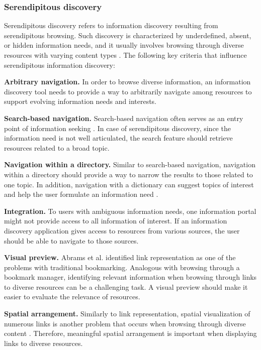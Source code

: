 \documentclass{casconpaper}
\begin{document}
{\subsubsection{Serendipitous discovery}
Serendipitous discovery refers to information discovery resulting from serendipitous  browsing. Such discovery is characterized by underdefined, absent, or hidden information needs, and it usually involves browsing through diverse resources with varying content types \cite{kellar2006}. The following key criteria that influence serendipitous information discovery:

\textbf{Arbitrary navigation.} In order to browse diverse information, an information discovery tool needs to provide a way to arbitrarily navigate among resources to support evolving information needs and interests.

\textbf{Search-based navigation.} Search-based navigation often serves as an entry point of information seeking \cite{levene}. In case of serendipitous discovery, since the information need is not well articulated, the search feature should retrieve resources related to a broad topic.

\textbf{Navigation within a directory.} Similar to search-based navigation, navigation within a directory should provide a way to narrow the results to those related to one topic. In addition, navigation with a dictionary can suggest topics of interest and help the user formulate an information need \cite{levene}.

\textbf{Integration.} To users with ambiguous information needs, one information portal might not provide access to all information of interest. If an information discovery application gives access to resources from various sources, the user should be able to navigate to those sources.

\textbf{Visual preview.} Abrams et al. \cite{abrams} identified link representation as one of the problems with traditional bookmarking. Analogous with browsing through a bookmark manager, identifying relevant information when browsing through links to diverse resources can be a challenging task. A visual preview should make it easier to evaluate the relevance of resources.

\textbf{Spatial arrangement.} Similarly to link representation, spatial visualization of numerous links is another problem that occurs when browsing through diverse content \cite{abrams}. Therefore, meaningful spatial arrangement is important when displaying links to diverse resources.



} %
\end{document}
